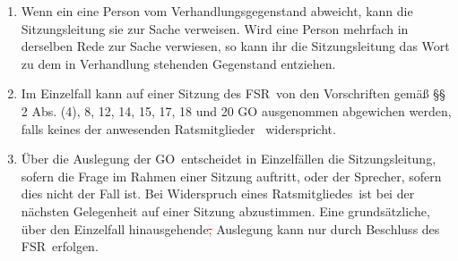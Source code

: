 \documentclass[a4paper, 12pt, ngerman]{article}
\newcommand{\streichen}[1]{\textcolor{red}{\sout{#1}}}
\newcommand{\rat}{FSR}
\newcommand{\rates}{FSR}
\newcommand{\go}{GO}
\newcommand{\mitglieder}{Ratsmitglieder}
\newcommand{\mitgliedes}{Ratsmitgliedes}
\newcommand{\fsmitglieder}{Fachschaftsmitglieder}
\begin{document}
\begin{enumerate}[leftmargin=0cm]
\begin{enumerate}[leftmargin=0cm]
		\item Anträge nach \cref{go.antrage} lit. a, b und d können auch \fsmitglieder~stellen, die grundsätzlich kein Antragsrecht haben. \cref{go.ratsantrag} gilt hier nicht.\label{mitgliederantrag}
		\item Wird dem Antrag auf Schluss der Redeliste stattgegeben, so
		verliest die Sitzungsleitung die Namen der auf der Redeliste
		stehenden Personen und fragt nach weiteren Wortmeldungen.
		Die Redeliste wird dann geschlossen.
		\item Wird ein Antrag gemäß \cref{go.antrage} lit. j vertagt, so kann er erst wieder behandelt werden,
		falls dem \rat~mindestens vierundzwanzig Stunden vor Sitzungsbeginn ein schriftlicher,
		 begründeter Antrag zukommt. Die Einreichung per Mail ist dabei zulässig.
		\item Über Anträge nach \cref{go.antrage} lit. e ist umgehend und ohne Aussprache abzustimmen.
		\item Wird ein Antrag zur \go~abgelehnt, so darf er zu derselben Sache nicht von derselben Person
		wiederholt werden. 
		\item Im Ermessen der Sitzungsleitung kann ein Antrag zur GO auch dann als angenommen bzw. abgelehnt gelten, wenn die anwesenden \mitglieder~ihre Meinung durch Zuruf mehrheitlich kundtun. Anträge nach \cref{go.antrage} lit. b oder c bleiben hiervon unberührt.
	\end{enumerate}
	
	
	\item {}
	
	Wenn ein eine Person vom Verhandlungsgegenstand abweicht, kann die Sitzungsleitung sie zur Sache verweisen. Wird eine Person mehrfach in derselben Rede zur Sache verwiesen, so kann ihr die Sitzungsleitung das Wort zu dem in Verhandlung stehenden Gegenstand entziehen.
	
	\item {}
	
	Im Einzelfall kann auf einer Sitzung des \rates~von den Vorschriften gemäß %
	§§ 2
	Abs. (4), 8, 12, 14, 15, 17, 18 und 20 GO ausgenommen  abgewichen werden, falls keines der anwesenden \mitglieder~
	widerspricht.
	
	\item {}
	
	 Über die Auslegung der \go~entscheidet in Einzelfällen die Sitzungsleitung, sofern die Frage im Rahmen einer Sitzung auftritt, oder der Sprecher, sofern dies nicht der Fall ist. Bei Widerspruch eines \mitgliedes~ist bei der nächsten Gelegenheit auf einer Sitzung abzustimmen. Eine grundsätzliche, 
	 über den Einzelfall hinausgehende\streichen{,} Auslegung kann nur durch Beschluss des \rates~erfolgen.			
	\end{enumerate}
\end{document}

